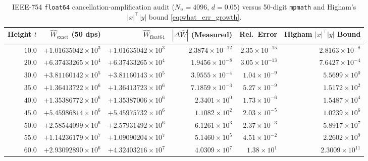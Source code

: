 \documentclass[11pt,a4paper,reqno]{amsart}
\theoremstyle{definition}
\theoremstyle{remark}
\numberwithin{equation}{section}
\newcommand{\What}{\widehat{W}}
\begin{document}
\begin{table}[htbp]
\centering
\caption{IEEE-754 \texttt{float64} cancellation-amplification audit ($N_u = 4096$, $d = 0.05$) versus 50-digit \texttt{mpmath} and Higham's $|x|^\top|y|$ bound \eqref{eq:what_err_growth}.}\label{tab:float64_audit}
\scriptsize
\setlength{\tabcolsep}{4.0pt}
\begin{tabular}{rrrrrr}
\toprule
\textbf{Height $t$} & \textbf{$\What_{\mathrm{exact}}$ (50 dps)} & \textbf{$\What_{\mathrm{float64}}$} & \textbf{$|\Delta\What|$ (Measured)} & \textbf{Rel.\ Error} & \textbf{Higham $|x|^\top|y|$ Bound} \\
\midrule
$10.0$ & $+1.01635042 \times 10^{3}$ & $+1.01635042 \times 10^{3}$ & $2.3874 \times 10^{-12}$ & $2.35 \times 10^{-15}$ & $2.8163 \times 10^{-8}$ \\
$20.0$ & $+6.37433265 \times 10^{4}$ & $+6.37433265 \times 10^{4}$ & $1.9456 \times 10^{-8}$  & $3.05 \times 10^{-13}$ & $7.6427 \times 10^{-4}$ \\
$30.0$ & $+3.81160142 \times 10^{5}$ & $+3.81160143 \times 10^{5}$ & $3.9555 \times 10^{-4}$  & $1.04 \times 10^{-9}$  & $5.5699 \times 10^{0}$  \\
$35.0$ & $+1.36413722 \times 10^{6}$ & $+1.36413723 \times 10^{6}$ & $7.1859 \times 10^{-3}$  & $5.27 \times 10^{-9}$  & $1.5172 \times 10^{2}$  \\
$40.0$ & $+1.35386772 \times 10^{6}$ & $+1.35387006 \times 10^{6}$ & $2.3401 \times 10^{0}$   & $1.73 \times 10^{-6}$  & $1.5487 \times 10^{4}$  \\
$45.0$ & $+5.45986814 \times 10^{6}$ & $+5.45975732 \times 10^{6}$ & $1.1082 \times 10^{2}$   & $2.03 \times 10^{-5}$  & $1.0239 \times 10^{6}$  \\
$50.0$ & $+2.58544099 \times 10^{6}$ & $+2.57931492 \times 10^{6}$ & $6.1261 \times 10^{3}$   & $2.37 \times 10^{-3}$  & $5.8917 \times 10^{7}$  \\
$55.0$ & $+1.14236179 \times 10^{7}$ & $+1.09090204 \times 10^{7}$ & $5.1460 \times 10^{5}$   & $4.51 \times 10^{-2}$  & $2.2602 \times 10^{9}$  \\
$60.0$ & $+2.93092890 \times 10^{6}$ & $+4.32403216 \times 10^{7}$ & $4.0309 \times 10^{7}$   & $1.38 \times 10^{1}$   & $2.3009 \times 10^{11}$ \\
\bottomrule
\end{tabular}
\end{table}
\end{document}
